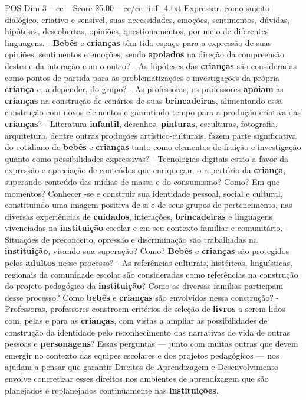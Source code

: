 \begin{textsample}{POS Dim 3 – ce – Score 25.00 – ce/ce\_inf\_4.txt}
Expressar, como sujeito dialógico, criativo e sensível, suas necessidades, emoções, sentimentos, dúvidas, hipóteses, descobertas, opiniões, questionamentos, por meio de diferentes linguagens. - \textbf{Bebês} e \textbf{crianças} têm tido espaço para a expressão de suas opiniões, sentimentos e emoções, sendo \textbf{apoiados} na direção da compreensão destes e da interação com o outro? - As hipóteses das \textbf{crianças} são consideradas como pontos de partida para as problematizações e investigações da própria \textbf{criança} e, a depender, do grupo? - As professoras, os professores \textbf{apoiam} as \textbf{crianças} na construção de cenários de suas \textbf{brincadeiras}, alimentando essa construção com novos elementos e garantindo tempo para a produção criativa das \textbf{crianças}? - Literatura \textbf{infantil}, desenhos, \textbf{pinturas}, esculturas, fotografia, arquitetura, dentre outras produções artístico-culturais, fazem parte significativa do cotidiano de \textbf{bebês} e \textbf{crianças} tanto como elementos de fruição e investigação quanto como possibilidades expressivas? - Tecnologias digitais estão a favor da expressão e apreciação de conteúdos que enriqueçam o repertório da \textbf{criança}, superando conteúdo das mídias de massa e do consumismo?
Como?
Em que momentos?
Conhecer -se e construir sua identidade pessoal, social e cultural, constituindo uma imagem positiva de si e de seus grupos de pertencimento, nas diversas experiências de \textbf{cuidados}, interações, \textbf{brincadeiras} e linguagens vivenciadas na \textbf{instituição} escolar e em seu contexto familiar e comunitário. - Situações de preconceito, opressão e discriminação são trabalhadas na \textbf{instituição}, visando sua superação?
Como? \textbf{Bebês} e \textbf{crianças} são protegidos pelos \textbf{adultos} nesse processo? - As referências culturais, históricas, linguísticas, regionais da comunidade escolar são consideradas como referências na construção do projeto pedagógico da \textbf{instituição}?
Como as diversas famílias participam desse processo?
Como \textbf{bebês} e \textbf{crianças} são envolvidos nessa construção? - Professoras, professores constroem critérios de seleção de \textbf{livros} a serem lidos com, pelas e para as \textbf{crianças}, com vistas a ampliar as possibilidades de construção da identidade pelo reconhecimento das narrativas de vida de outras pessoas e \textbf{personagens}?
Essas perguntas — junto com muitas outras que devem emergir no contexto das equipes escolares e dos projetos pedagógicos — nos ajudam a pensar que garantir Direitos de Aprendizagem e Desenvolvimento envolve concretizar esses direitos nos ambientes de aprendizagem que são planejados e replanejados continuamente nas \textbf{instituições}.

\end{textsample}
